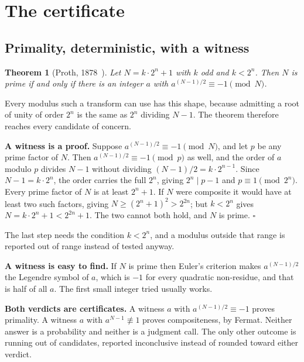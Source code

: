 \documentclass{article}
\newtheorem{theorem}{Theorem}
\begin{document}
\section{The certificate}

\subsection{Primality, deterministic, with a witness}

\begin{theorem}[Proth, 1878~\cite{proth}]
Let \(N = k \cdot 2^n + 1\) with \(k\) odd and \(k < 2^n\). Then \(N\) is prime if and only if there is an integer \(a\) with \(a^{(N-1)/2} \equiv -1 \pmod N\).
\end{theorem}

Every modulus such a transform can use has this shape, because admitting a root of unity of order \(2^n\) is the same as \(2^n\) dividing \(N-1\). The theorem therefore reaches every candidate of concern.

\textbf{A witness is a proof.} Suppose \(a^{(N-1)/2} \equiv -1 \pmod N\), and let \(p\) be any prime factor of \(N\). Then \(a^{(N-1)/2} \equiv -1 \pmod p\) as well, and the order of \(a\) modulo \(p\) divides \(N-1\) without dividing \((N-1)/2 = k \cdot 2^{n-1}\). Since \(N - 1 = k \cdot 2^n\), the order carries the full \(2^n\), giving \(2^n \mid p-1\) and \(p \equiv 1 \pmod{2^n}\). Every prime factor of \(N\) is at least \(2^n + 1\). If \(N\) were composite it would have at least two such factors, giving \(N \ge (2^n+1)^2 > 2^{2n}\); but \(k < 2^n\) gives \(N = k \cdot 2^n + 1 < 2^{2n} + 1\). The two cannot both hold, and \(N\) is prime. \(\square\)

The last step needs the condition \(k < 2^n\), and a modulus outside that range is reported out of range instead of tested anyway.

\textbf{A witness is easy to find.} If \(N\) is prime then Euler's criterion makes \(a^{(N-1)/2}\) the Legendre symbol of \(a\), which is \(-1\) for every quadratic non-residue, and that is half of all \(a\). The first small integer tried usually works.

\textbf{Both verdicts are certificates.} A witness \(a\) with \(a^{(N-1)/2} \equiv -1\) proves primality. A witness \(a\) with \(a^{N-1} \not\equiv 1\) proves compositeness, by Fermat. Neither answer is a probability and neither is a judgment call. The only other outcome is running out of candidates, reported inconclusive instead of rounded toward either verdict.
\end{document}

